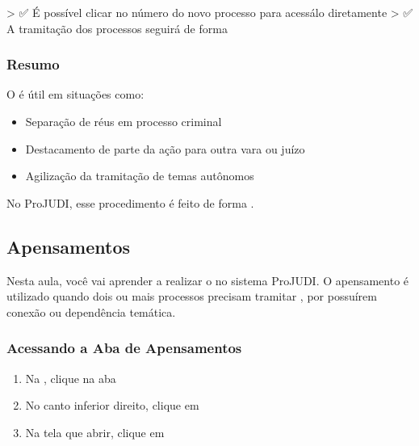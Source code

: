 \documentclass[letterpaper,10pt,brazil]{sphinxmanual}
\begin{document}
\sphinxAtStartPar
\textgreater{} ✅ É possível clicar no número do novo processo para acessá\sphinxhyphen{}lo diretamente
\textgreater{} ✅ A tramitação dos processos seguirá de forma 


\subsubsection{Resumo}
\label{\detokenize{projud_27_desmembramentoprocesso:resumo}}
\sphinxAtStartPar
O  é útil em situações como:
\begin{itemize}
\item {} 
\sphinxAtStartPar
Separação de réus em processo criminal

\item {} 
\sphinxAtStartPar
Destacamento de parte da ação para outra vara ou juízo

\item {} 
\sphinxAtStartPar
Agilização da tramitação de temas autônomos

\end{itemize}

\sphinxAtStartPar
No ProJUDI, esse procedimento é feito de forma .

\sphinxstepscope


\subsection{Apensamentos}
\label{\detokenize{projud_28_apensamentos:apensamentos}}\label{\detokenize{projud_28_apensamentos::doc}}
\sphinxAtStartPar
Nesta aula, você vai aprender a realizar o  no sistema ProJUDI. O apensamento é utilizado quando dois ou mais processos precisam tramitar , por possuírem conexão ou dependência temática.


\subsubsection{Acessando a Aba de Apensamentos}
\label{\detokenize{projud_28_apensamentos:acessando-a-aba-de-apensamentos}}\begin{enumerate}
%
\item {} 
\sphinxAtStartPar
Na , clique na aba 

\item {} 
\sphinxAtStartPar
No canto inferior direito, clique em 

\item {} 
\sphinxAtStartPar
Na tela que abrir, clique em 

\end{enumerate}
\end{document}
